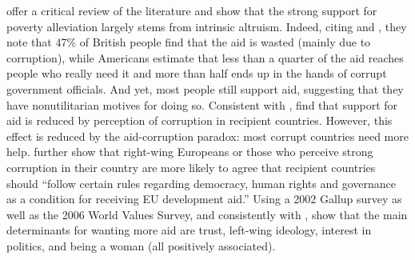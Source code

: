 \citet{hudson_mile_2012} offer a critical review of the literature and show that the strong support for poverty alleviation largely stems from intrinsic altruism. Indeed, citing \citet{dfid_aid_2009} and \citet{pipa_americans_2001}, they note that 47\% of British people find that the aid is wasted (mainly due to corruption), while Americans estimate that less than a quarter of the aid reaches people who really need it and more than half ends up in the hands of corrupt government officials. And yet, most people still support aid, suggesting that they have nonutilitarian motives for doing so. Consistent with \citet{henson_public_2010}, \citet{bauhr_does_2013} find that support for aid is reduced by perception of corruption in recipient countries. However, this effect is reduced by the aid-corruption paradox: most corrupt countries need more help. \citet{bodenstein_who_2017} further show that right-wing Europeans or those who perceive strong corruption in their country are more likely to agree that recipient countries should ``follow certain rules regarding democracy, human rights and governance as a condition for receiving EU development aid.'' 
Using a 2002 Gallup survey as well as the 2006 World Values Survey, and consistently with \citet{bayram_aiding_2017}, \citet{paxton_individual_2012} show that the main determinants for wanting more aid are trust, left-wing ideology, interest in politics, and being a woman (all positively associated). %

